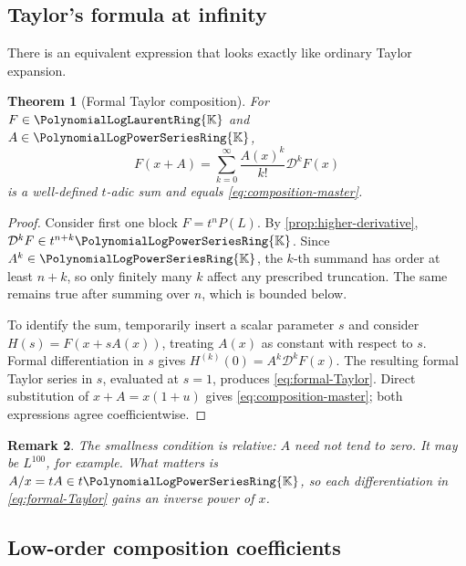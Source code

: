 \documentclass[11pt]{article}
\theoremstyle{pltheorem}
\newtheorem{theorem}{Theorem}[section]
\newtheorem{remark}[theorem]{Remark}
\newcommand{\K}{\mathbb K}
\newcommand{\PL}{\PolynomialLogPowerSeriesRing{\K}}
\newcommand{\PLL}{\PolynomialLogLaurentRing{\K}}
\newcommand{\D}{\mathcal D}
\begin{document}
\subsection{Taylor's formula at infinity}

There is an equivalent expression that looks exactly like ordinary Taylor expansion.

\begin{theorem}[Formal Taylor composition]\label{thm:formal-Taylor}
For \(F\in\PLL\) and \(A\in\PL\),
\begin{equation}\label{eq:formal-Taylor}
 F(x+A)=\sum_{k=0}^{\infty}\frac{A(x)^k}{k!}\D^kF(x)
\end{equation}
is a well-defined \(t\)-adic sum and equals \cref{eq:composition-master}.
\end{theorem}

\begin{proof}
Consider first one block \(F=t^nP(L)\).  By
\cref{prop:higher-derivative}, \(\D^kF\in t^{n+k}\PL\).  Since
\(A^k\in\PL\), the \(k\)-th summand has order at least \(n+k\), so only finitely many \(k\) affect any prescribed truncation.  The same remains true after summing over \(n\), which is bounded below.

To identify the sum, temporarily insert a scalar parameter \(s\) and consider
\(H(s)=F(x+sA(x))\), treating \(A(x)\) as constant with respect to \(s\).  Formal differentiation in \(s\) gives
\(H^{(k)}(0)=A^k\D^kF(x)\).  The resulting formal Taylor series in \(s\), evaluated at \(s=1\), produces \cref{eq:formal-Taylor}.  Direct substitution of
\(x+A=x(1+u)\) gives \cref{eq:composition-master}; both expressions agree coefficientwise.
\end{proof}

\begin{remark}
The smallness condition is relative: \(A\) need not tend to zero.  It may be \(L^{100}\), for example.  What matters is \(A/x=tA\in t\PL\), so each differentiation in \cref{eq:formal-Taylor} gains an inverse power of \(x\).
\end{remark}

\subsection{Low-order composition coefficients}
\end{document}
